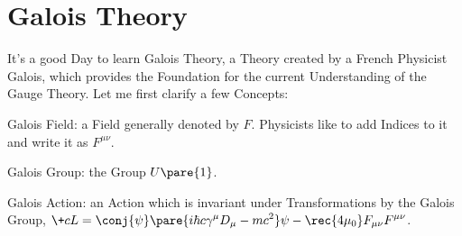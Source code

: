 \documentclass[hidelinks]{ctexart}
\begin{document}
\section{Galois Theory} %
\label{sec:galois_theory}

It's a good Day to learn Galois Theory, a Theory created by a French Physicist Galois, which provides the Foundation for the current Understanding of the Gauge Theory. Let me first clarify a few Concepts:
\begin{cenum}
    \item Galois Field: a Field generally denoted by $F$. Physicists like to add Indices to it and write it as $F^{\mu\nu}$.
    \item Galois Group: the Group $U\pare{1}$.
    \item Galois Action: an Action which is invariant under Transformations by the Galois Group, $\displaystyle \+cL = \conj{\psi} \pare{i\hbar c\gamma^\mu D_\mu - mc^2}\psi - \rec{4\mu_0}F_{\mu\nu}F^{\mu\nu}$.
\end{cenum}

\end{document}

